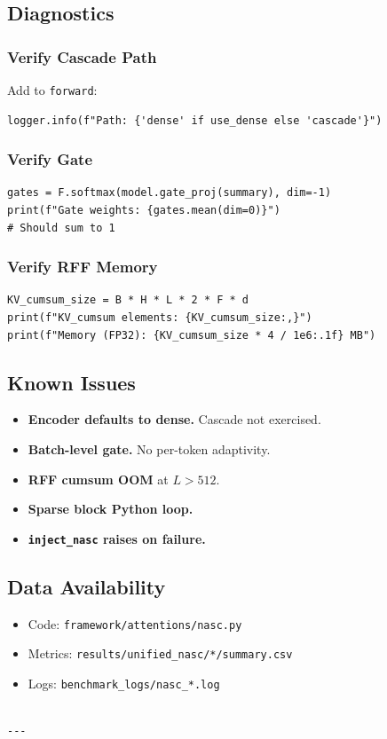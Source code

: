 \subsection{Diagnostics}

\subsubsection{Verify Cascade Path}

Add to \texttt{forward}:

\begin{lstlisting}
logger.info(f"Path: {'dense' if use_dense else 'cascade'}")
\end{lstlisting}

\subsubsection{Verify Gate}

\begin{lstlisting}
gates = F.softmax(model.gate_proj(summary), dim=-1)
print(f"Gate weights: {gates.mean(dim=0)}")
# Should sum to 1
\end{lstlisting}

\subsubsection{Verify RFF Memory}

\begin{lstlisting}
KV_cumsum_size = B * H * L * 2 * F * d
print(f"KV_cumsum elements: {KV_cumsum_size:,}")
print(f"Memory (FP32): {KV_cumsum_size * 4 / 1e6:.1f} MB")
\end{lstlisting}

\subsection{Known Issues}

\begin{itemize}
\item \textbf{Encoder defaults to dense.} Cascade not exercised.
\item \textbf{Batch-level gate.} No per-token adaptivity.
\item \textbf{RFF cumsum OOM} at $L > 512$.
\item \textbf{Sparse block Python loop.}
\item \textbf{\texttt{inject\_nasc} raises on failure.}

\end{itemize}
\subsection{Data Availability}

\begin{itemize}
\item Code: \texttt{framework/attentions/nasc.py}
\item Metrics: \texttt{results/unified\_nasc/*/summary.csv}
\item Logs: \texttt{benchmark\_logs/nasc\_*.log}
\end{itemize}
\begin{lstlisting}

---
\end{lstlisting}